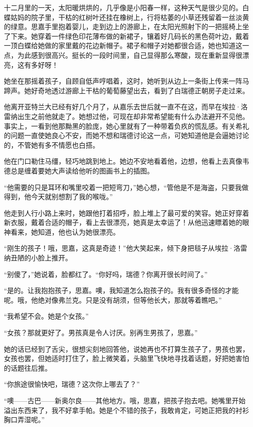 \par 十二月里的一天，太阳暖烘烘的，几乎像是小阳春一样，这种天气是很少见的。白蝶姑妈的院子里，干枯的红树叶还挂在橡树上，行将枯萎的小草还残留着一丝淡黄的绿意。思嘉手里抱着婴儿，走到边上的游廊上，在太阳光照射下的一把摇椅上坐了下来。她穿着一件绿色印花薄布做的新裙子，镶着好几码长的黑色荷叶边，戴着一顶白蝶给她做的家里戴的花边新帽子。裙子和帽子对她都很合适，她也知道这一点，为此感到很高兴。挺长的一段时间里，自己显得那么寒酸，现在重新显得很漂亮，这有多好呀！
\par 她坐在那摇着孩子，自顾自低声哼唱着，这时，她听到从边上一条街上传来一阵马蹄声。她好奇地透过游廊上干枯的葡萄藤望出去，看到了白瑞德正朝房子走过来。
\par 他离开亚特兰大已经有好几个月了，从嘉乐去世后就一直不在这，而早在埃拉·洛雷纳出生之前他就走了。她想过他，可现在却非常希望能有什么办法避开不见他。事实上，一看到他那黝黑的脸庞，她心里就有了一种带着负疚的慌乱感。有关希礼的问题一直使她良心不安，而她不想和瑞德讨论这一点，可她知道他是会逼她讨论的，不管她有多不情愿也白搭。
\par 他在门口勒住马缰，轻巧地跳到地上。她边不安地看着他，边想，他看上去真像韦德总是缠着要她大声读给他听的图画书上的插图。
\par “他需要的只是耳环和嘴里咬着一把短弯刀，”她心想，“管他是不是海盗，只要我做得到，他今天就别想割了我的喉咙。”
\par 他走到人行小路上来时，她跟他打着招呼，脸上堆上了最可爱的笑容。她正好穿着新衣服，戴着合适的帽子，看上去很漂亮，她真是太幸运了！从他迅速瞟着她的眼神看来，她知道，他也认为她很漂亮。
\par “刚生的孩子！哦，思嘉，这真是奇迹！”他大笑起来，倾下身把毯子从埃拉·洛雷纳丑陋的小脸上推开。
\par “别傻了，”她说着，脸都红了。“你好吗，瑞德？你离开很长时间了。”
\par “是的。让我抱抱孩子，思嘉。噢，我知道怎么抱孩子的。我有很多奇怪的才能呢。哦，他绝对像弗兰克。只是没有胡须，但等他长大，那就等着瞧吧。”
\par “我希望不会。她是个女孩。”
\par “女孩？那就更好了。男孩真是令人讨厌。别再生男孩了，思嘉。”
\par 她的话已经到了舌尖，很想尖刻地回答他，说她再也不打算生孩子了，男孩也罢，女孩也罢，但她适时打住了，脸上微笑着，头脑里飞快地寻找着话题，好把她害怕的话题往后推。
\par “你旅途很愉快吧，瑞德？这次你上哪去了？”
\par “噢——古巴——新奥尔良——其他地方。哦，思嘉，把孩子抱去吧。她嘴里开始溢出东西来了，我不好拿手帕。她是个不错的孩子，我敢肯定，可她正把我的衬衫胸口弄湿呢。”
